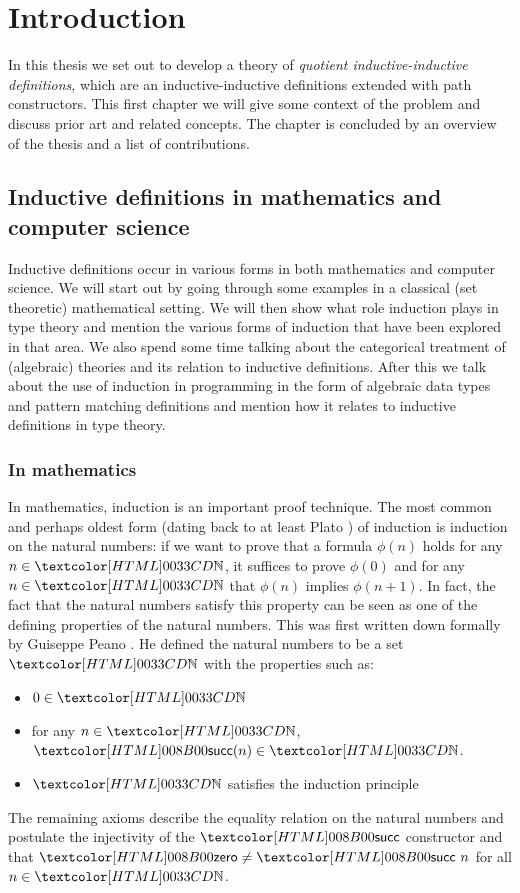 \chapter{Introduction}
\label{intro}

In this thesis we set out to develop a theory of \emph{quotient
  inductive-inductive definitions}, which are an inductive-inductive
definitions \cite{NordvallForsberg2013} extended with path
constructors. This first chapter we will give some context of the
problem and discuss prior art and related concepts. The chapter is
concluded by an overview of the thesis and a list of contributions.

\section{Inductive definitions in mathematics and computer science}

Inductive definitions occur in various forms in both mathematics and
computer science. We will start out by going through some examples in
a classical (set theoretic) mathematical setting. We will then show
what role induction plays in type theory and mention the various forms
of induction that have been explored in that area. We also spend some
time talking about the categorical treatment of (algebraic) theories
and its relation to inductive definitions. After this we talk about
the use of induction in programming in the form of algebraic data
types and pattern matching definitions and mention how it relates to
inductive definitions in type theory.

\subsection{In mathematics}
In mathematics, induction is an important proof technique. The most
common and perhaps oldest form (dating back to at least Plato
\cite{Acerbi2000}) of induction is induction on the natural numbers:
if we want to prove that a formula $\phi(n)$ holds for any
$n \in \natty$, it suffices to prove $\phi(0)$ and for any
$n \in \natty$ that $\phi(n)$ implies $\phi(n+1)$. In fact, the fact that
the natural numbers satisfy this property can be seen as one of the
defining properties of the natural numbers. This was first written
down formally by Guiseppe Peano \cite{Peano1889}. He defined the natural numbers to be
a set $\natty$ with the properties such as:
\begin{itemize}
\item $0 \in \natty$
\item for any $n \in \natty$, $\natsucc(n) \in \natty$.
\item $\natty$ satisfies the induction principle
\end{itemize}
The remaining axioms describe the equality relation on the natural
numbers and postulate the injectivity of the $\natsucc$ constructor
and that $\natzero \neq \natsucc\ n$ for all $n \in \natty$.

